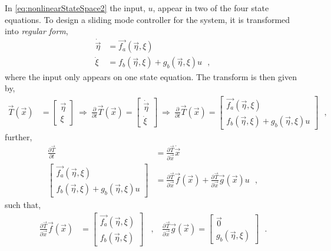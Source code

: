 In \autoref{eq:nonlinearStateSpace2} the input, $u$, appear in two of the four state equations. To design a sliding mode controller for the system, it is transformed into \textit{regular form}, 
\begin{align}
  \dot{\vec{\eta}} &=  \vec{f_a}(\vec{\eta},\xi) \nonumber   \\
  \dot{\xi}        &=  f_b(\vec{\eta},\xi) + g_b(\vec{\eta},\xi) u    \ \ \ ,
  \label{eq:regularForm}
\end{align}
%
where the input only appears on one state equation.
The transform is then given by,
\begin{align}
  \vec{T}(\vec{x}) &=
  \begin{bmatrix}
    \vec{\eta} \\
    \xi
  \end{bmatrix}
  \ \Rightarrow \ 
  \frac{\partial}{\partial t}\vec{T}(\vec{x})
  =
  \begin{bmatrix}
    \dot{\vec{\eta}} \\
    \dot{\xi}
  \end{bmatrix}
  \ \Rightarrow \ 
  \frac{\partial}{\partial t}\vec{T}(\vec{x})
  =
  \begin{bmatrix}
    \vec{f_a}(\vec{\eta},\xi)         \\
    f_b(\vec{\eta},\xi) + g_b(\vec{\eta},\xi) u
  \end{bmatrix}
   \ \ \ ,
  \label{eq:transformAndDerivative}
\end{align}
further,
\begin{align}
  \frac{\partial \vec{T}}{\partial t} &= \frac{\partial \vec{T}}{\partial \vec{x}}  \dot{\vec{x}} \\
  \begin{bmatrix}
    \vec{f_a}(\vec{\eta},\xi)         \\
    f_b(\vec{\eta},\xi) + g_b(\vec{\eta},\xi) u
  \end{bmatrix}
  &=
  \frac{\partial \vec{T}}{\partial \vec{x}} \vec{f}(\vec{x}) + \frac{\partial \vec{T}}{\partial \vec{x}} \vec{g}(\vec{x}) u
  \ \ \ ,
  \label{eq:transformDerivative}
\end{align}
such that,
\begin{align}
  \frac{\partial \vec{T}}{\partial \vec{x}} \vec{f}(\vec{x})    
  &= 
  \begin{bmatrix}
    \vec{f_a}(\vec{\eta},\xi)       \\
    f_b(\vec{\eta},\xi)
  \end{bmatrix}  \ \ \ \ ,\ \ \ \ 
  \frac{\partial \vec{T}}{\partial \vec{x}} \vec{g}(\vec{x})
  = 
  \begin{bmatrix}
    \vec{0}        \\
    g_b(\vec{\eta},\xi)
  \end{bmatrix}
  \ \ \ .
  \label{eq:transformXDerivative}
\end{align}
